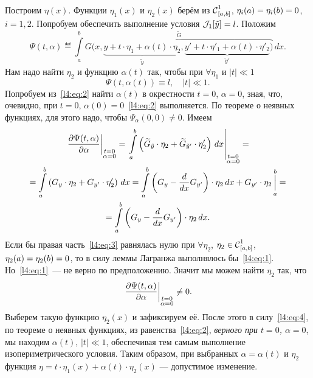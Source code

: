 Построим $\eta(x)$. Функции $\eta_1(x)$ и $\eta_2(x)$ берём из $\Cfn[{[a,b]}]{1}$, $\eta_i(a)=\eta_i(b)\?=0$, $i=1,2$. Попробуем обеспечить выполнение условия $\J_1[\tilde{y}]=l$. Положим
\begin{equation*}
	\Psi(t,\alpha)\eqdef\int\limits_a^b \overbrace{G\big(x,\underbrace{y+t\cdot\eta_1+\alpha(t)\cdot\eta_2}_{\tilde{y}},\underbrace{y'+t\cdot\eta'_1+\alpha(t)\cdot\eta'_2}_{\tilde{y}'}\big)}^{\widetilde{G}}\,dx.
\end{equation*}
Нам надо найти $\eta_2$ и функцию $\alpha(t)$ так, чтобы при $\forall\eta_1$ и $|t|\ll1$
\begin{equation}
	\label{l4:eq:2}
	\Psi(t,\alpha(t))\equiv l,\quad|t|\ll1.
\end{equation}
Попробуем из~\eqref{l4:eq:2} найти $\alpha(t)$ в окрестности $t=0$, $\alpha=0$, зная, что, очевидно, при $t=0$, ${\alpha(0)=0}$~\eqref{l4:eq:2} выполняется. По теореме о неявных функциях{\mb ,} для этого надо, чтобы $\Psi_{\alpha}(0,0)\neq0$. Имеем
\begin{multline}
	\label{l4:eq:3}
	\left.\pder{\Psi(t,\alpha)}{\alpha}\right|_{\substack{t=0\\\alpha=0}}=\left.\int\limits_a^b\left(\widetilde{G}_{\tilde{y}}\cdot\eta_2+\widetilde{G}_{\tilde{y}'}\cdot\eta'_2\right)\,dx\right|_{\substack{t=0\\\alpha=0}}=\\=\int\limits_a^b\left({G}_{{y}}\cdot\eta_2+{G}_{y'}\cdot\eta'_2\right)\,dx
	=\int\limits_a^b\left(G_y-\der{}{x}G_{y'}\right)\cdot\eta_2\,dx+G_{y'}\cdot\eta_2\mathop{\Big|}\limits_a^b=\\=\int\limits_a^b\left(G_y-\der{}{x}G_{y'}\right)\cdot\eta_2\,dx.
\end{multline}
Если бы правая часть~\eqref{l4:eq:3} равнялась нулю при $\forall\eta_2$, $\eta_2\in\Cfn[{[a,b]}]{1}$, $\eta_2(a)\?=\eta_2(b)=0$, то в силу леммы Лагранжа выполнялось бы~\eqref{l4:eq:1}. Но~\eqref{l4:eq:1}~--- не верно по предположению. Значит{\mb} мы можем найти $\eta_2$ так, что
\begin{equation}
	\label{l4:eq:4}
	\left.\pder{\Psi(t,\alpha)}{\alpha}\right|_{\substack{t=0\\\alpha=0}}\neq0.
\end{equation}
Выберем такую функцию $\eta_2(x)$ и зафиксируем её. После этого в силу~\eqref{l4:eq:4}{\mb,} по теореме о неявных функциях{\mb,} из равенства~\eqref{l4:eq:2}, \emph{верного при  $t=0$, $\alpha=0$}, мы находим $\alpha(t)$, $|t|\ll1$, обеспечивая тем самым выполнение изопериметрического условия. Таким образом, при выбранных $\alpha=\alpha(t)$ и $\eta_2$ функция $\eta=t\cdot\eta_1(x)+\alpha(t)\cdot\eta_2(x)$ --- допустимое изменение.

